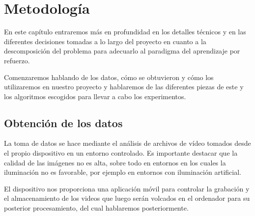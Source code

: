 
\cleardoublepage

\chapter{Metodología}
\label{metodologia}

En este capítulo entraremos más en profundidad en los detalles técnicos y en las diferentes decisiones tomadas a lo largo del proyecto en cuanto a la descomposición del problema para adecuarlo al paradigma del aprendizaje por refuerzo.
\medskip

Comenzaremos hablando de los datos, cómo se obtuvieron y cómo los utilizaremos en nuestro proyecto y hablaremos de las diferentes piezas de este y los algoritmos escogidos para llevar a cabo los experimentos.
\medskip

\section{Obtención de los datos}
\label{obtencion-datos}

La toma de datos se hace mediante el análisis de archivos de vídeo tomados desde el propio dispositivo en un entorno controlado. Es importante destacar que la calidad de las imágenes no es alta, sobre todo en entornos en los cuales la iluminación no es favorable, por ejemplo en entornos con iluminación artificial. 
\medskip

El dispositivo nos proporciona una aplicación móvil para controlar la grabación y el almacenamiento de los videos que luego serán volcados en el ordenador para su posterior procesamiento, del cual hablaremos posteriormente.
\medskip

